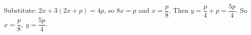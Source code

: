 Substitute: $2x+3(2x+p)=4p$, so $8x=p$ and $x=\dfrac p8$. Then $y=\dfrac p4+p=\dfrac{5p}4$. So $\boxed{x=\dfrac p8,\ y=\dfrac{5p}4}$.
